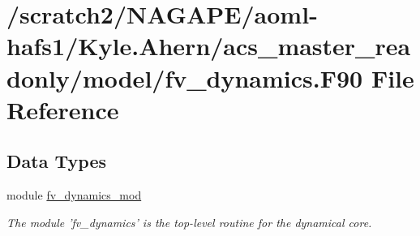 \section{/scratch2/\-N\-A\-G\-A\-P\-E/aoml-\/hafs1/\-Kyle.Ahern/acs\-\_\-master\-\_\-readonly/model/fv\-\_\-dynamics.F90 File Reference}
\label{fv__dynamics_8F90}
\subsection*{Data Types}
\begin{DoxyCompactItemize}
\item 
module \hyperlink{classfv__dynamics__mod}{fv\-\_\-dynamics\-\_\-mod}
\begin{DoxyCompactList}\small\item\em The module 'fv\-\_\-dynamics' is the top-\/level routine for the dynamical core. \end{DoxyCompactList}\end{DoxyCompactItemize}
